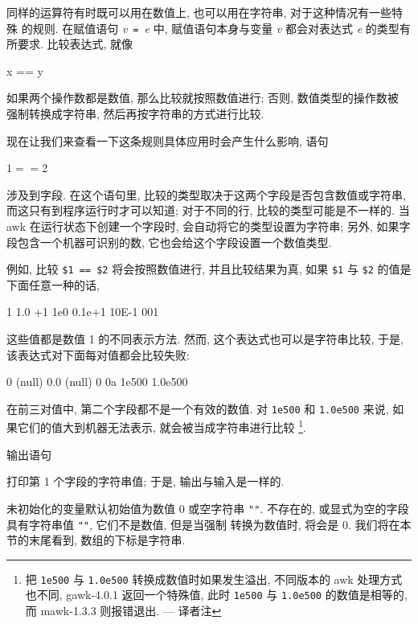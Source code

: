 同样的运算符有时既可以用在数值上, 也可以用在字符串, 对于这种情况有一些特殊
的规则. 在赋值语句 \textit{v}\ \verb'='\ \textit{e} 中, 赋值语句本身与变量
\textit{v} 都会对表达式 \textit{e} 的类型有所要求. 比较表达式, 就像
\begin{awkcode}
    x == y
\end{awkcode}
如果两个操作数都是数值, 那么比较就按照数值进行; 否则, 数值类型的操作数被
强制转换成字符串, 然后再按字符串的方式进行比较.

现在让我们来查看一下这条规则具体应用时会产生什么影响, 语句
\begin{awkcode}
    $1 == $2
\end{awkcode}
涉及到字段. 在这个语句里, 比较的类型取决于这两个字段是否包含数值或字符串,
而这只有到程序运行时才可以知道; 对于不同的行, 比较的类型可能是不一样的.
当 awk 在运行状态下创建一个字段时, 会自动将它的类型设置为字符串; 另外,
如果字段包含一个机器可识别的数, 它也会给这个字段设置一个数值类型.

例如, 比较 \verb'$1 == $2' 将会按照数值进行, 并且比较结果为真, 如果
\verb'$1' 与 \verb'$2' 的值是下面任意一种的话,
\begin{awkcode}
    1   1.0    +1   1e0    0.1e+1   10E-1    001
\end{awkcode}
这些值都是数值 1 的不同表示方法. 然而, 这个表达式也可以是字符串比较, 于是,
该表达式对下面每对值都会比较失败:
\begin{awkcode}
    0           (null)
    0.0         (null)
    0           0a
    1e500       1.0e500
\end{awkcode}
在前三对值中, 第二个字段都不是一个有效的数值. 对 \verb'1e500' 和
\verb'1.0e500' 来说, 如果它们的值大到机器无法表示, 就会被当成字符串进行比较
\footnote{把 \texttt{1e500} 与 \texttt{1.0e500} 转换成数值时如果发生溢出,
不同版本的 awk 处理方式也不同, gawk-4.0.1 返回一个特殊值, 此时
\texttt{1e500} 与 \texttt{1.0e500} 的数值是相等的, 而 mawk-1.3.3 则报错退出.
--- 译者注}.

输出语句
打印第 1 个字段的字符串值; 于是, 输出与输入是一样的.

未初始化的变量默认初始值为数值 0 或空字符串 \verb'""'.
不存在的, 或显式为空的字段具有字符串值 \verb'""', 它们不是数值, 但是当强制
转换为数值时, 将会是 0. 我们将在本节的末尾看到, 数组的下标是字符串.

